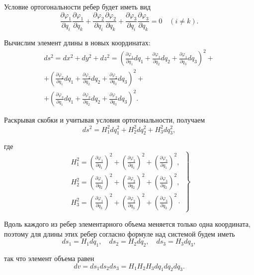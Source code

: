 Условие ортогональности ребер будет иметь вид
\[
\frac{\partial \varphi_{1}}{\partial q_{i}} \frac{\partial \varphi_{1}}{\partial q_{k}}+\frac{\partial \varphi_{2}}{\partial q_{i}} \frac{\partial \varphi_{2}}{\partial q_{k}}+\frac{\partial \varphi_{3}}{\partial q_{i}} \frac{\partial \varphi_{3}}{\partial q_{k}}=0 \quad(i \neq k) .
\]

Вычислим элемент длины в новых координатах:
\[
\begin{aligned} 
	d s^{2}=d x^{2}+d y^{2}+ d z^{2}=\left(\frac{\partial \varphi_{1}}{\partial q_{1}} d q_{1}+\frac{\partial \varphi_{1}}{\partial q_{2}} d q_{2}+\frac{\partial \varphi_{1}}{\partial q_{3}} d q_{3}\right)^{2}+ \\
	+\left(\frac{\partial \varphi_{2}}{\partial q_{1}} d q_{1}+\frac{\partial \varphi_{2}}{\partial q_{2}} d q_{2}+\frac{\partial \varphi_{2}}{\partial q_{3}} d q_{3}\right)^{2}+ \\
	+\left(\frac{\partial \varphi_{3}}{\partial q_{1}} d q_{1}+\frac{\partial \varphi_{3}}{\partial q_{2}} d q_{2}+\frac{\partial \varphi_{3}}{\partial q_{3}} d q_{3}\right)^{2} .
\end{aligned}
\]

Раскрывая скобки и учитывая условия ортогональности, получаем
\[
d s^{2}=H_{1}^{2} d q_{1}^{2}+H_{2}^{2} d q_{2}^{2}+H_{3}^{2} d q_{3}^{2},
\]

где
\[
\left.\begin{aligned}
	H_{1}^{2}=\left(\frac{\partial \varphi_{1}}{\partial q_{1}}\right)^{2}+\left(\frac{\partial \varphi_{2}}{\partial q_{1}}\right)^{2}+\left(\frac{\partial \varphi_{3}}{\partial q_{1}}\right)^{2}, \\
	H_{2}^{2}=\left(\frac{\partial \varphi_{1}}{\partial q_{2}}\right)^{2}+\left(\frac{\partial \varphi_{2}}{\partial q_{2}}\right)^{2}+\left(\frac{\partial \varphi_{3}}{\partial q_{2}}\right)^{2}, \\
	H_{3}^{2}=\left(\frac{\partial \varphi_{1}}{\partial q_{3}}\right)^{2}+\left(\frac{\partial \varphi_{2}}{\partial q_{3}}\right)^{2}+\left(\frac{\partial \varphi_{3}}{\partial q_{3}}\right)^{2} \cdot
\end{aligned}\right\}
\]

Вдоль каждого из ребер элементарного объема меняется только одна координата, поэтому для длины этих ребер согласно формуле над системой будем иметь
\[
d s_{1}=H_{1} d q_{1}, \quad d s_{2}=H_{2} d q_{2}, \quad d s_{3}=H_{3} d q_{3},
\]

так что элемент объема равен
\[
d v=d s_{1} d s_{2} d s_{3}=H_{1} H_{2} H_{3} d q_{1} d q_{2} d q_{3} .
\]

